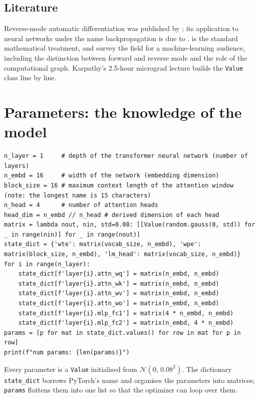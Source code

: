 \documentclass[11pt,letterpaper]{article}
\theoremstyle{remark}
\newcommand{\code}[1]{\lstinline[basicstyle=\ttfamily\small]|#1|}
\begin{document}
\subsection{Literature}

Reverse-mode automatic differentiation was published by \textcite{linnainmaa1976taylor}; its application to neural networks under the name backpropagation is due to \textcite{rumelhart1986learning}. \textcite{griewank2008evaluating} is the standard mathematical treatment, and \textcite{baydin2018autodiff} survey the field for a machine-learning audience, including the distinction between forward and reverse mode and the role of the computational graph. Karpathy's 2.5-hour micrograd lecture \parencite{karpathy2022microgradvideo} builds the \code{Value} class line by line.

\section{Parameters: the knowledge of the model}
\label{sec:params}

\begin{lstlisting}
n_layer = 1     # depth of the transformer neural network (number of layers)
n_embd = 16     # width of the network (embedding dimension)
block_size = 16 # maximum context length of the attention window (note: the longest name is 15 characters)
n_head = 4      # number of attention heads
head_dim = n_embd // n_head # derived dimension of each head
matrix = lambda nout, nin, std=0.08: [[Value(random.gauss(0, std)) for _ in range(nin)] for _ in range(nout)]
state_dict = {'wte': matrix(vocab_size, n_embd), 'wpe': matrix(block_size, n_embd), 'lm_head': matrix(vocab_size, n_embd)}
for i in range(n_layer):
    state_dict[f'layer{i}.attn_wq'] = matrix(n_embd, n_embd)
    state_dict[f'layer{i}.attn_wk'] = matrix(n_embd, n_embd)
    state_dict[f'layer{i}.attn_wv'] = matrix(n_embd, n_embd)
    state_dict[f'layer{i}.attn_wo'] = matrix(n_embd, n_embd)
    state_dict[f'layer{i}.mlp_fc1'] = matrix(4 * n_embd, n_embd)
    state_dict[f'layer{i}.mlp_fc2'] = matrix(n_embd, 4 * n_embd)
params = [p for mat in state_dict.values() for row in mat for p in row]
print(f"num params: {len(params)}")
\end{lstlisting}

Every parameter is a \code{Value} initialised from $\mathcal N(0,\,0.08^2)$. The dictionary \code{state_dict} borrows PyTorch's name and organises the parameters into matrices; \code{params} flattens them into one list so that the optimizer can loop over them.
\end{document}
